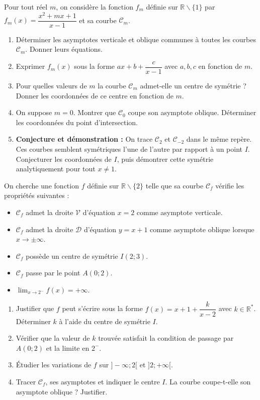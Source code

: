 \documentclass[11pt]{article}
\def\setminus{\mathbin{\backslash}}\let\smallsetminus\setminus
\begin{document}
\begin{exercice}
Pour tout réel $m$, on considère la fonction $f_m$ définie sur $\mathbb{R}\setminus\{1\}$ par $f_m(x)=\dfrac{x^2+mx+1}{x-1}$ et sa courbe $\mathcal{C}_m$.
\begin{enumerate}
    \item Déterminer les asymptotes verticale et oblique communes à toutes les courbes $\mathcal{C}_m$. Donner leurs équations.
    \item Exprimer $f_m(x)$ sous la forme $ax+b+\dfrac{c}{x-1}$ avec $a,b,c$ en fonction de $m$.
    \item Pour quelles valeurs de $m$ la courbe $\mathcal{C}_m$ admet-elle un centre de symétrie ? Donner les coordonnées de ce centre en fonction de $m$.
    \item On suppose $m=0$. Montrer que $\mathcal{C}_0$ coupe son asymptote oblique. Déterminer les coordonnées du point d'intersection.
    \item \textbf{Conjecture et démonstration :} On trace $\mathcal{C}_2$ et $\mathcal{C}_{-2}$ dans le même repère. Ces courbes semblent symétriques l'une de l'autre par rapport à un point $I$. Conjecturer les coordonnées de $I$, puis démontrer cette symétrie analytiquement pour tout $x\neq 1$.
\end{enumerate}
\end{exercice}

\begin{exercice}
On cherche une fonction $f$ définie sur $\mathbb{R}\setminus\{2\}$ telle que sa courbe $\mathcal{C}_f$ vérifie les propriétés suivantes :
\begin{itemize}
    \item $\mathcal{C}_f$ admet la droite $\mathcal{V}$ d'équation $x=2$ comme asymptote verticale.
    \item $\mathcal{C}_f$ admet la droite $\mathcal{D}$ d'équation $y=x+1$ comme asymptote oblique lorsque $x\to\pm\infty$.
    \item $\mathcal{C}_f$ possède un centre de symétrie $I(2;3)$.
    \item $\mathcal{C}_f$ passe par le point $A(0;2)$.
    \item $\displaystyle\lim_{x\to 2^-} f(x)=+\infty$.
\end{itemize}
\begin{enumerate}
    \item Justifier que $f$ peut s'écrire sous la forme $f(x)=x+1+\dfrac{k}{x-2}$ avec $k\in\mathbb{R}^*$. Déterminer $k$ à l'aide du centre de symétrie $I$.
    \item Vérifier que la valeur de $k$ trouvée satisfait la condition de passage par $A(0;2)$ et la limite en $2^-$.
    \item Étudier les variations de $f$ sur $]-\infty;2[$ et $]2;+\infty[$.
    \item Tracer $\mathcal{C}_f$, ses asymptotes et indiquer le centre $I$. La courbe coupe-t-elle son asymptote oblique ? Justifier.
\end{enumerate}
\end{exercice}
\end{document}
